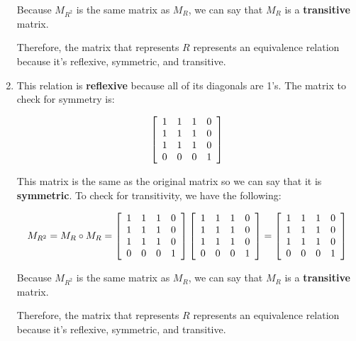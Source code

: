 \documentclass[letterpaper, 12pt]{article}
\begin{document}
\begin{enumerate}
    Because $M_{R^2}$ is the same matrix as $M_R$, we can say that $M_R$ is a \textbf{transitive} matrix.
    
    Therefore, the matrix that represents $R$ represents an equivalence relation because it's reflexive, symmetric, and transitive.
    
    \item This relation is \textbf{reflexive} because all of its diagonals are 1's. The matrix to check for symmetry is:
    
    \[
    \left[
    \begin{array}{c c c c}
         1 & 1 & 1 & 0 \\
         1 & 1 & 1 & 0 \\
         1 & 1 & 1 & 0 \\
         0 & 0 & 0 & 1
    \end{array}
    \right]
    \]
    
    This matrix is the same as the original matrix so we can say that it is \textbf{symmetric}. To check for transitivity, we have the following:
    
    \[
    M_{R^2} = M_R \circ M_R = 
    \left[
    \begin{array}{c c c c}
         1 & 1 & 1 & 0 \\
         1 & 1 & 1 & 0 \\
         1 & 1 & 1 & 0 \\
         0 & 0 & 0 & 1
    \end{array}
    \right]
    \left[
    \begin{array}{c c c c}
         1 & 1 & 1 & 0 \\
         1 & 1 & 1 & 0 \\
         1 & 1 & 1 & 0 \\
         0 & 0 & 0 & 1
    \end{array}
    \right]
    =
    \left[
    \begin{array}{c c c c}
         1 & 1 & 1 & 0 \\
         1 & 1 & 1 & 0 \\
         1 & 1 & 1 & 0 \\
         0 & 0 & 0 & 1
    \end{array}
    \right]
    \]
    
    Because $M_{R^2}$ is the same matrix as $M_R$, we can say that $M_R$ is a \textbf{transitive} matrix.
    
    Therefore, the matrix that represents $R$ represents an equivalence relation because it's reflexive, symmetric, and transitive.
\end{enumerate}
\end{document}
